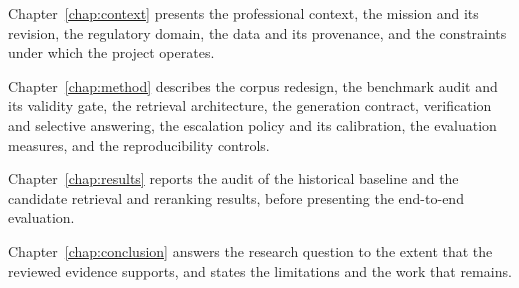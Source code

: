 Chapter~\ref{chap:context} presents the professional context, the mission and its revision, the regulatory domain, the data and its provenance, and the constraints under which the project operates.

Chapter~\ref{chap:method} describes the corpus redesign, the benchmark audit and its validity gate, the retrieval architecture, the generation contract, verification and selective answering, the escalation policy and its calibration, the evaluation measures, and the reproducibility controls.

Chapter~\ref{chap:results} reports the audit of the historical baseline and the candidate retrieval and reranking results, before presenting the end-to-end evaluation.

Chapter~\ref{chap:conclusion} answers the research question to the extent that the reviewed evidence supports, and states the limitations and the work that remains.
